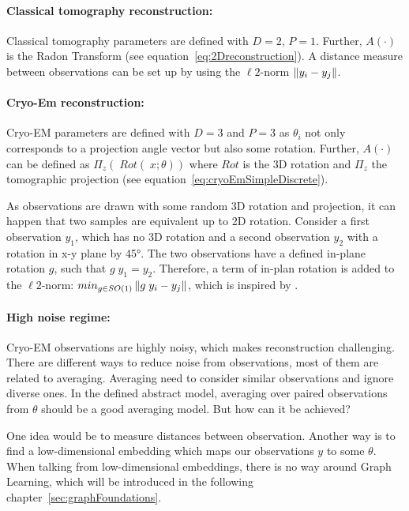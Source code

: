 \paragraph{Classical tomography reconstruction:}

Classical tomography parameters are defined with $D=2$, $P=1$.
Further, $A(\cdot)$ is the Radon Transform (see equation~\ref{eq:2Dreconstruction}).
A distance measure between observations can be set up by using the $\ell2$-norm $\left\lVert y_i - y_j\right\rVert$.

\paragraph{Cryo-Em reconstruction:}
Cryo-EM parameters are defined with $D=3$ and $P=3$ as $\theta_i$ not only corresponds to
a projection angle vector but also some rotation.
Further, $A(\cdot)$ can be defined as $\Pi_z \left(\; Rot(\;x; \theta) \right)$ 
where $Rot$ is the 3D rotation and $\Pi_z$ the tomographic projection (see equation~\ref{eq:cryoEmSimpleDiscrete}).

As observations are drawn with some random 3D rotation and projection, 
it can happen that two samples are equivalent up to 2D rotation. 
Consider a first observation $y_1$, which has no 3D rotation and 
a second observation $y_2$ with a rotation in x-y plane by 45°.
The two observations have a defined in-plane rotation $g$, such that $g \; y_1 = y_2$.
Therefore, a term of in-plan rotation is added to the $\ell2$-norm: $min_{g \in SO(1)}\left\lVert g \;y_i - y_j\right\rVert$, 
which is inspired by \cite{multiDiffusionMaps}. 

\paragraph{High noise regime:}
Cryo-EM observations are highly noisy, which makes reconstruction challenging. 
There are different ways to reduce noise from observations, most of them are related to averaging. 
Averaging need to consider similar observations and ignore diverse ones. 
In the defined abstract model, averaging over paired observations from $\theta$ should be a good averaging model.
But how can it be achieved? 

One idea would be to measure distances between observation.
Another way is to find a low-dimensional embedding which maps our observations $y$ to some $\theta$.
When talking from low-dimensional embeddings, there is no way around Graph Learning, which will be introduced
in the following chapter~\ref{sec:graphFoundations}.


